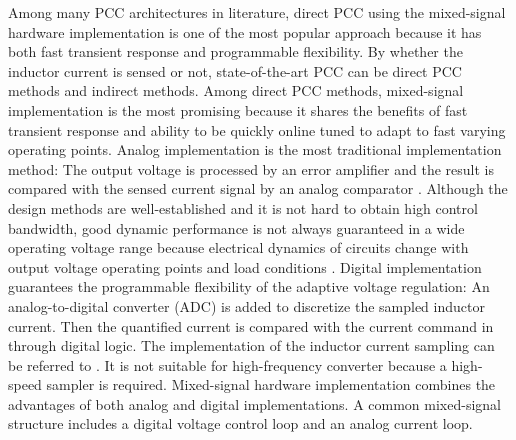 Among many PCC architectures in literature, direct PCC using the mixed-signal hardware implementation is one of the most popular approach because it has both fast transient response and programmable flexibility. By whether the inductor current is sensed or not, state-of-the-art PCC can be direct PCC methods and indirect methods. Among direct PCC methods, mixed-signal implementation is the most promising because it shares the benefits of fast transient response and ability to be quickly online tuned to adapt to fast varying operating points. Analog implementation is the most traditional implementation method: The output voltage is processed by an error amplifier and the result is compared with the sensed current signal by an analog comparator \cite{Kaz2006tcs}. Although the design methods are well-established and it is not hard to obtain high control bandwidth, good dynamic performance is not always guaranteed in a wide operating voltage range because {\color{red} electrical dynamics} of circuits change with output voltage operating points and load conditions \cite{erikson2007}. Digital implementation guarantees the programmable flexibility of the adaptive voltage regulation: An analog-to-digital converter (ADC) is added to discretize the sampled inductor current. Then the quantified current is compared with the current command in through digital logic. The implementation of the inductor current sampling can be referred to \cite{Lilee2008APEC}. It is not suitable for high-frequency converter because a high-speed sampler is required. Mixed-signal hardware implementation \cite{Prodic2011tcs} \cite{Huerta2012} combines the advantages of both analog and digital implementations. A common mixed-signal structure includes a digital voltage control loop and an analog current loop.

